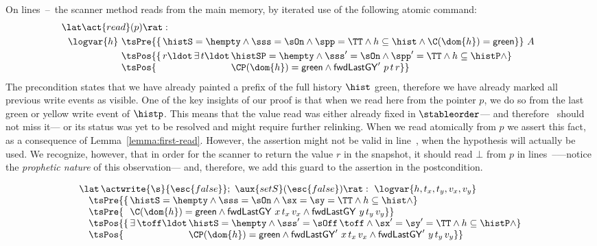On lines~\lineScanReadsX--\lineScanReadsY~the scanner method reads
from the main memory, by iterated use of the following atomic command:
%
\[
\begin{array}{l}
  \lat \act{read}(p) \rat:\\[3pt] ~~ \logvar{h}
  \!\begin{array}[t]{l}
     \tsPre{\{\, \histS = \hempty \wedge
       \sss = \sOn \wedge \spp = \TT \wedge
       h \subseteq \hist \wedge
       \C(\dom{h}) = \mathsf{green}\}}\ A\\[3pt]
     \tsPos{\{\, r\ldot\, \exists\, t\ldot\,
       \histSP = \hempty \wedge
       \sss' = \sOn \wedge \spp' = \TT \wedge
       h \subseteq \histP \wedge}\\
     \tsPos{\phantom{\{\, r\ldot\, \exists\, t\ldot}\,
       \CP(\dom{h}) = \mathsf{green} \wedge    
       \botLGY'\ p\, t\, r \}}
  \end{array}
\end{array}
\]
%
The precondition states that we have already painted a prefix of the
full history $\hist$ green, therefore we have already marked all
previous write events as visible. One of the key insights of our proof
is that when we read here from the pointer $p$, we do so from the last
green or yellow write event of $\histp$. This means that the value
read was either already fixed in $\stableorder$--- and therefore
\jyscan\ should not miss it--- or its status was yet to be resolved
and might require further relinking. When we read atomically from $p$
we assert this fact, as a consequence of
Lemma~\ref{lemma:first-read}. However, the assertion might not be
valid in line~\lineScanRelinks, when the hypothesis will actually be
used. We recognize, however, that in order for the scanner to return
the value $r$ in the snapshot, it should read $\bot$ from $p$ in
lines~\lineScanReadsFX--\lineScanReadsFY---notice the \emph{prophetic
  nature} of this observation--- and, therefore, we add this guard to
the assertion in the postcondition.

\[
\begin{array}{l}
  \lat\,\actwrite{\s}{\esc{false}};\ \aux{setS}(\esc{false}) \rat :\
  \logvar{h, t_x,t_y,v_x,v_y}\\
  ~~~
  \tsPre{\{\, \histS = \hempty \wedge
    \sss = \sOn \wedge \sx = \sy = \TT \wedge
    h \subseteq \hist \wedge}\\
  ~~~
  \tsPre{\phantom{\{\,}
    \C(\dom{h}) = \mathsf{green} \wedge
    \botLGY\ x\, t_x\, v_x \wedge
    \botLGY\ y\, t_y\, v_y \}}\\
  ~~~
  \tsPos{\{\, \exists\, \toff\ldot\, \histS = \hempty \wedge
    \sss' = \sOff\, \toff \wedge \sx' = \sy' = \TT \wedge
    h \subseteq \histP \wedge }\\
  ~~~
  \tsPos{\phantom{\{\, \exists\, \toff\ldot}\,
    \CP(\dom{h}) = \mathsf{green} \wedge
    \botLGY'\ x\, t_x\, v_x \wedge \botLGY'\ y\, t_y\, v_y \}}
\end{array}
\]

